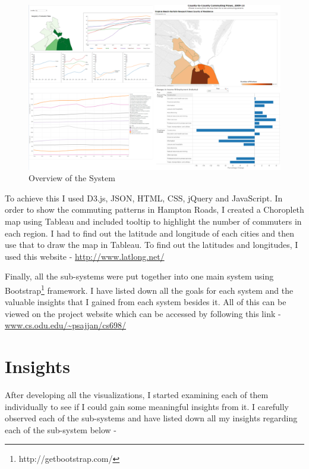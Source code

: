 \documentclass[12pt]{article}
\begin{document}
\begin{figure}[htp]
\centering
\includegraphics[scale = 0.35]{Overall.PNG}
\caption{Overview of the System}
\label{highq}
\end{figure}

\newpage

To achieve this I used D3.js, JSON, HTML, CSS, jQuery and JavaScript. In order to show the commuting patterns in Hampton Roads, I created a Choropleth map using Tableau and included tooltip to highlight the number of commuters in each region. I had to find out the latitude and longitude of each cities and then use that to draw the map in Tableau. To find out the latitudes and longitudes, I used this website - \url{http://www.latlong.net/}

Finally, all the sub-systems were put together into one main system using Bootstrap\footnote[5]{http://getbootstrap.com/} framework. I have listed down all the goals for each system and the valuable insights that I gained from each system besides it. All of this can be viewed on the project website which can be accessed by following this link - \url{www.cs.odu.edu/~psajjan/cs698/}

\newpage

\section{Insights}
After developing all the visualizations, I started examining each of them individually to see if I could gain some meaningful insights from it. I carefully observed each of the sub-systems and have listed down all my insights regarding each of the sub-system below - 
\end{document}
